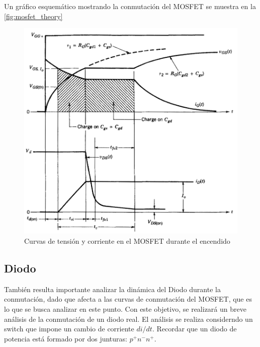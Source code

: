\documentclass[e4_tp1_main.tex]{subfiles}
\begin{document}
Un gráfico esquemático mostrando la conmutación del MOSFET se muestra en la \autoref{fig:mosfet_theory}


\begin{figure}[H]
  \centering
  \includegraphics[width=\linewidth/2]{images/ej1/theory_mosfet.png}
  \caption{Curvas de tensión y corriente en el MOSFET durante el encendido}
  \label{fig:mosfet_theory}
\end{figure}

\subsection{Diodo}
También resulta importante analizar la dinámica del Diodo durante la conmutación, dado que afecta a las curvas de conmutación del MOSFET, que es lo que se busca analizar en este punto. Con este objetivo, se realizará un breve análisis de la conmutación de un diodo real. El análisis se realiza considerndo un switch que impone un cambio de corriente $di/dt$. Recordar que un diodo de potencia está formado por dos junturas: $p^+n^-n^+$.
\end{document}
